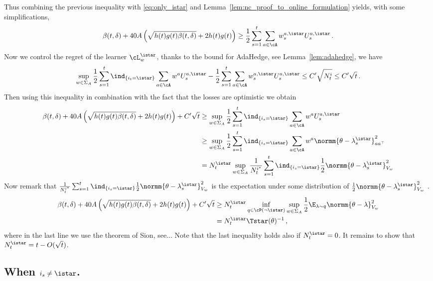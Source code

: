 Thus combining the previous inequality with \eqref{eq:only_istar} and Lemma~\ref{lem:nc_proof_to_online_formulation} yields, with some simplifications,
\begin{equation}
\label{eq:to_UCB}
\beta(t,\delta) + 40 A\left(\sqrt{h(t)g(t) \beta(t,\delta)}+ 2h(t)g(t)\right) \geq \frac{1}{2}\sum_{s=1}^t\sum_{a\in\cA} w_s^{a,\istar}U_s^{a,\istar}\,.
\end{equation}
Now we control the regret of the learner $\cL_w^{\istar}$, thanks to the bound for AdaHedge, see Lemma~\ref{lem:adahedge}, we have
\[
\sup_{w\in\Sigma_A}\frac{1}{2}\sum_{s=1}^t\ind_{\{i_t = \istar\}}\sum_{a\in\cA} w^{a}U_s^{a,\istar} -\frac{1}{2}\sum_{s=1}^t\sum_{a\in\cA} w_s^{a,\istar}U_s^{a,\istar} \leq C'\sqrt{N_t^i}\leq C'\sqrt{t}\,.
\]
Then using this inequality in combination with the fact that the losses are optimistic we obtain
\begin{align*}
  \beta(t,\delta) + 40 A\left(\sqrt{h(t)g(t) \beta(t,\delta)}+ 2h(t)g(t)\right) +C'\sqrt{t}
  &\geq \sup_{w\in\Sigma_A}\frac{1}{2}\sum_{s=1}^t\ind_{\{i_s = \istar\}}\sum_{a\in\cA} w^{a}U_s^{a,\istar}
  \\
  &\geq \sup_{w\in\Sigma_A}\frac{1}{2}\sum_{s=1}^t\ind_{\{i_s = \istar\}}\sum_{a\in\cA} w^{a} \normm{\theta -\lambda_s^{\istar}}^2_{aa^\top}
  \\
  &= N^{\istar}_t \sup_{w\in\Sigma_A}\frac{1}{N^{i^*}_t}\sum_{s=1}^t\ind_{\{i_s = \istar\}}\frac{1}{2}\normm{\theta -\lambda_s^{\istar}}^2_{V_{w}}
  \end{align*}
Now remark that $\frac{1}{N^{i^*}_t}\sum_{s=1}^t\ind_{\{i_s = \istar\}}\frac{1}{2}\normm{\theta -\lambda_s^{\istar}}^2_{V_{w}}$ is the expectation under some distribution of $\frac{1}{2}\normm{\theta -\lambda_s^{\istar}}^2_{V_{w}}$ .
\begin{align*}
  \beta(t,\delta) + 40 A\left(\sqrt{h(t)g(t) \beta(t,\delta)}+ 2h(t)g(t)\right) +C'\sqrt{t}
  &\geq N^{\istar}_t \inf_{q\in\cP(\neg \istar)} \sup_{w\in\Sigma_A}\frac{1}{2}\E_{\lambda\sim q}\normm{\theta -\lambda}^2_{V_{w}}\\
 &=N^{\istar}_t \Tstar(\theta)^{-1}\,,
\end{align*}
where in the last line we use the theorem of Sion, see...%
Note that the last inequality holds also if $N_t^{\istar} = 0$. It remains to show that $N^{\istar}_t = t- O(\sqrt{t})$.

\subsection{When $i_s \neq \istar$.}

